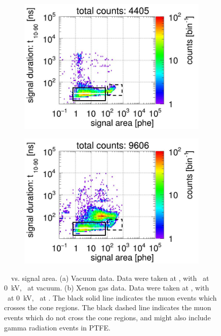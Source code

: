 \begin{figure}[!p]
	\centering
	\begin{subfigure}[b]{0.8\textwidth}
		\centering
		\includegraphics[width=\figurewidth,clip,trim={0 0 0 0}]{Figures/GasTest/CutsValid/res65831/pdpa00Vecfig65831rev.jpg}%
		\caption{}
		\label{fig:Chrenkov c}
	\end{subfigure}
	\par\bigskip
	\begin{subfigure}[b]{0.8\textwidth}
		\centering
		\includegraphics[width=\figurewidth,clip,trim={0 0 0 0}]{Figures/GasTest/CutsValid/res64761/pdpa00Vecfig64761rev.jpg}%
		\caption{}
		\label{fig:Chrenkov d}
	\end{subfigure}
	\caption[\gtest\  \rpd\ vs. signal area.]{\gtest\  \rpd\ vs. signal area. (a) Vacuum data. Data were taken at , with \opvtvb\ at \SI{0}{\kV}, \opgd\ at vacuum. (b) Xenon gas data. Data were taken at , with \opvtvb\ at \SI{0}{\kV}, \opgd\ at \standarddensity . The black solid line indicates the muon events which crosses the cone regions. The black dashed line indicates the muon events which do not cross the cone regions, and might also include gamma radiation events in PTFE. 
	}
	\label{fig:ChrenkovCompare}
\end{figure}

